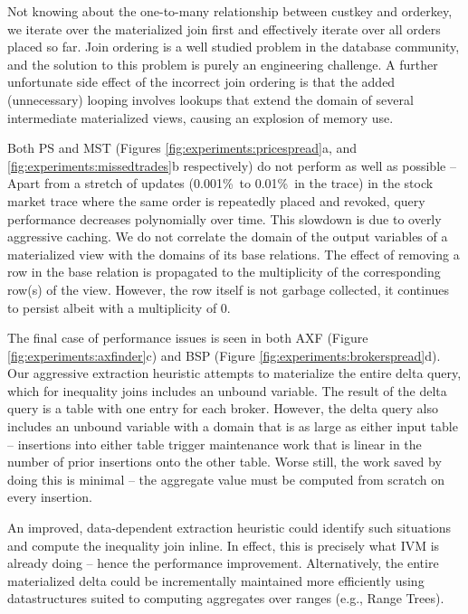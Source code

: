 Not knowing about the one-to-many relationship between custkey and orderkey, we iterate over the materialized join first and effectively iterate over all orders placed so far.  Join ordering is a well studied problem in the database community, and the solution to this problem is purely an engineering challenge.  A further unfortunate side effect of the incorrect join ordering is that the added (unnecessary) looping involves lookups that extend the domain of several intermediate materialized views, causing an explosion of memory use.


Both PS and MST (Figures \ref{fig:experiments:pricespread}a, and \ref{fig:experiments:missedtrades}b respectively) do not perform as well as possible -- Apart from a stretch of updates (0.001\%\ to 0.01\%\ in the trace) in the stock market trace where the same order is repeatedly placed and revoked, query performance decreases polynomially over time.  This slowdown is due to overly aggressive caching.  We do not correlate the domain of the output variables of a materialized view with the domains of its base relations.  The effect of removing a row in the base relation is propagated to the multiplicity of the corresponding row(s) of the view.  However, the row itself is not garbage collected, it continues to persist albeit with a multiplicity of 0.

The final case of performance issues is seen in both AXF (Figure \ref{fig:experiments:axfinder}c) and BSP (Figure \ref{fig:experiments:brokerspread}d).  Our aggressive extraction heuristic attempts to materialize the entire delta query, which for inequality joins includes an unbound variable.  The result of the delta query is a table with one entry for each broker.  However, the delta query also includes an unbound variable with a domain that is as large as either input table -- insertions into either table trigger maintenance work that is linear in the number of prior insertions onto the other table.  Worse still, the work saved by doing this is minimal -- the aggregate value must be computed from scratch on every insertion.

An improved, data-dependent extraction heuristic could identify such situations and compute the inequality join inline.  In effect, this is precisely what IVM is already doing -- hence the performance improvement.  Alternatively, the entire materialized delta could be incrementally maintained more efficiently using datastructures suited to computing aggregates over ranges (e.g., Range Trees\cite{rangequeries}).


